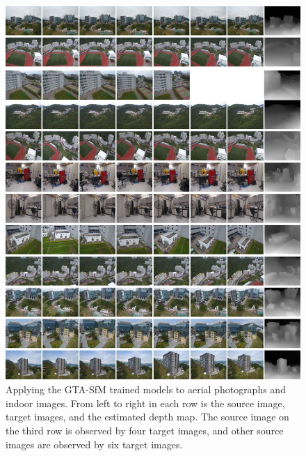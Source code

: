 \documentclass[letterpaper, 10 pt, conference]{ieeeconf}  %
\begin{document}
\begin{figure}[h]
\begin{center}
\includegraphics[width=0.9\linewidth]{figs/dji.pdf}
\end{center}
\caption{Applying the GTA-SfM trained models to aerial photographs and indoor images. From left to right in each row is the source image, target images, and the estimated depth map. The source image on the third row is observed by four target images, and other source images are observed by six target images.}
\label{fig:dji}
\end{figure}
 
\end{document}
